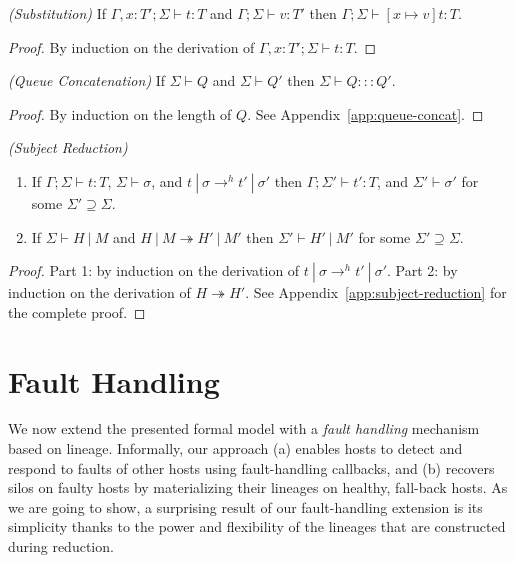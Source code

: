 \begin{lem}
\emph{(Substitution)}\label{th:subst}
If $\Gamma , x : T' ; \Sigma \vdash t : T$ and $\Gamma ; \Sigma \vdash v : T'$ then $\Gamma ; \Sigma \vdash [x \mapsto v]t : T$.
\end{lem}
\begin{proof}
By induction on the derivation of $\Gamma , x : T' ; \Sigma \vdash t : T$.
\end{proof}

\begin{lem}
\emph{(Queue Concatenation)}\label{lem:queue-concat}
If $\Sigma \vdash Q$ and $\Sigma \vdash Q'$ then $\Sigma \vdash Q ::: Q'$.
\end{lem}
\begin{proof}
By induction on the length of $Q$. See Appendix~\ref{app:queue-concat}.
\end{proof}


\begin{thm}
\emph{(Subject Reduction)}\label{th:subject-reduction}

\begin{enumerate}

\item If $\Gamma ; \Sigma \vdash t : T$, $\Sigma \vdash \sigma$, and $t~|~\sigma \rightarrow^h t'~|~\sigma'$ then $\Gamma ; \Sigma' \vdash t' : T$, and $\Sigma' \vdash \sigma'$ for some $\Sigma' \supseteq \Sigma$.

\item If $\Sigma \vdash H~|~M$ and $H~|~M \twoheadrightarrow H'~|~M'$ then $\Sigma' \vdash H'~|~M'$ for some $\Sigma' \supseteq \Sigma$.

\end{enumerate}

\end{thm}
\begin{proof}
  Part 1: by induction on the derivation of $t~|~\sigma \rightarrow^h
  t'~|~\sigma'$. Part 2: by induction on the derivation of $H
  \twoheadrightarrow H'$. See Appendix~\ref{app:subject-reduction} for
  the complete proof.
\end{proof}


\section{Fault Handling}

We now extend the presented formal model with a {\em fault handling}
mechanism based on lineage. Informally, our approach (a) enables hosts
to detect and respond to faults of other hosts using fault-handling
callbacks, and (b) recovers silos on faulty hosts by materializing
their lineages on healthy, fall-back hosts. As we are going to show, a
surprising result of our fault-handling extension is its simplicity
thanks to the power and flexibility of the lineages that are
constructed during reduction.

